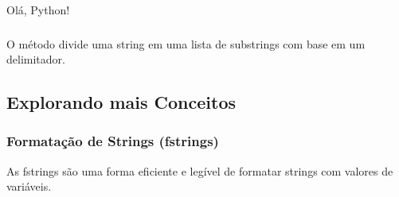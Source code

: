 \documentclass[letterpaper,10pt,english]{jupyterBook}
\begin{document}
\begin{sphinxVerbatim}[commandchars=\\\{\}]
Olá, Python!
\end{sphinxVerbatim}


\subsubsection{}
\label{\detokenize{chapters/ch6/ch6:split}}
\sphinxAtStartPar
O método  divide uma string em uma lista de substrings com base em um delimitador.

\sphinxAtStartPar
{}

\begin{sphinxVerbatim}[commandchars=\\\{\}]
  
  
\end{sphinxVerbatim}

\begin{sphinxVerbatim}[commandchars=\\\{\}]
\PYG{p}{[}    \PYG{p}{]}
\end{sphinxVerbatim}


\subsection{Explorando mais Conceitos}
\label{\detokenize{chapters/ch6/ch6:explorando-mais-conceitos}}

\subsubsection{Formatação de Strings (f\sphinxhyphen{}strings)}
\label{\detokenize{chapters/ch6/ch6:formatacao-de-strings-f-strings}}
\sphinxAtStartPar
As f\sphinxhyphen{}strings são uma forma eficiente e legível de formatar strings com valores de variáveis.
\end{document}
